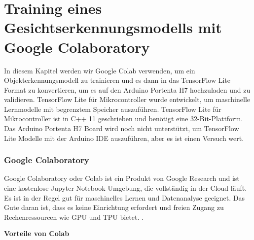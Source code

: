

%
%



\chapter{Training eines Gesichtserkennungsmodells mit Google Colaboratory}
	

In diesem Kapitel werden wir Google Colab verwenden, um ein Objekterkennungsmodell zu trainieren und es dann in das TensorFlow Lite Format zu konvertieren, um es auf den Arduino Portenta H7 hochzuladen und zu validieren. TensorFlow Lite für Mikrocontroller wurde entwickelt, um maschinelle Lernmodelle mit begrenztem Speicher auszuführen. TensorFlow Lite für Mikrocontroller ist in C++ 11 geschrieben und benötigt eine 32-Bit-Plattform.  Das Arduino Portenta H7 Board wird noch nicht unterstützt, um TensorFlow Lite Modelle mit der Arduino IDE \cite{GoogleTensorFlowLite:2021} auszuführen, aber es ist einen Versuch wert.



\subsection{Google Colaboratory}

Google Colaboratory oder Colab ist ein Produkt von Google Research und ist eine kostenlose Jupyter-Notebook-Umgebung, die vollständig in der Cloud läuft. Es ist in der Regel gut für maschinelles Lernen und Datenanalyse geeignet. Das Gute daran ist, dass es keine Einrichtung erfordert und freien Zugang zu Rechenressourcen wie GPU und TPU bietet. \cite{GoogleColab:2021}.

\bigskip


\textbf{Vorteile von Colab} 

